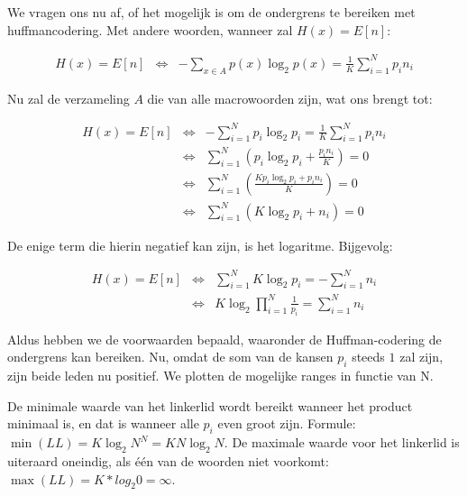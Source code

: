 \documentclass[]{article}
\begin{document}
\begin{section}
\begin{subsection}
        We vragen ons nu af, of het mogelijk is om de ondergrens te
        bereiken met huffmancodering. Met andere woorden, wanneer zal
        $H(x) = E[n]$:

        \begin{eqnarray*}
            H(x) = E[n]
            & \Leftrightarrow & - \sum_{x \in A}{p(x) \log_2{p(x)}}
                = \frac{1}{K} \sum_{i = 1}^{N}{p_i n_i}
        \end{eqnarray*}

        Nu zal de verzameling $A$ die van alle macrowoorden zijn,
        wat ons brengt tot:

        \begin{eqnarray*}
            H(x) = E[n]
            & \Leftrightarrow & - \sum_{i = 1}^{N}{p_i \log_2{p_i}}
                = \frac{1}{K} \sum_{i = 1}^{N}{p_i n_i} \\
            & \Leftrightarrow & \sum_{i = 1}^{N}(p_i \log_2{p_i}
                + \frac{p_i n_i}{K}) = 0 \\
            & \Leftrightarrow & \sum_{i = 1}^{N}(
                \frac{K p_i \log_2{p_i} + p_i n_i}{K}) = 0 \\
            & \Leftrightarrow & \sum_{i = 1}^{N}(K \log_2{p_i} + n_i)
                = 0
        \end{eqnarray*}

        De enige term die hierin negatief kan zijn, is het logaritme.
        Bijgevolg:

        \begin{eqnarray*}
            H(x) = E[n] & \Leftrightarrow &
            \sum_{i = 1}^{N}K \log_2{p_i} = - \sum_{i = 1}^{N} n_i
            \\ & \Leftrightarrow &
            K \log_2 {\prod_{i = 1}^{N}{\frac{1}{p_i}}}
                = \sum_{i = 1}^{N} n_i
        \end{eqnarray*}

        Aldus hebben we de voorwaarden bepaald, waaronder de
        Huffman-codering de ondergrens kan bereiken. Nu, omdat de som
        van de kansen $p_i$ steeds $1$ zal zijn, zijn beide leden nu
        positief. We plotten de mogelijke ranges in functie van N.

        De minimale waarde van het linkerlid wordt bereikt wanneer het
        product minimaal is, en dat is wanneer alle $p_i$ even groot
        zijn. Formule: $\min(LL) = K \log_2{N^N} = KN \log_2{N}$. De
        maximale waarde voor het linkerlid is uiteraard oneindig, als
        \'e\'en van de woorden niet voorkomt: $ \max(LL) = K*log_2{0}
        = \infty $.


\end{subsection}
\end{section}
\end{document}

